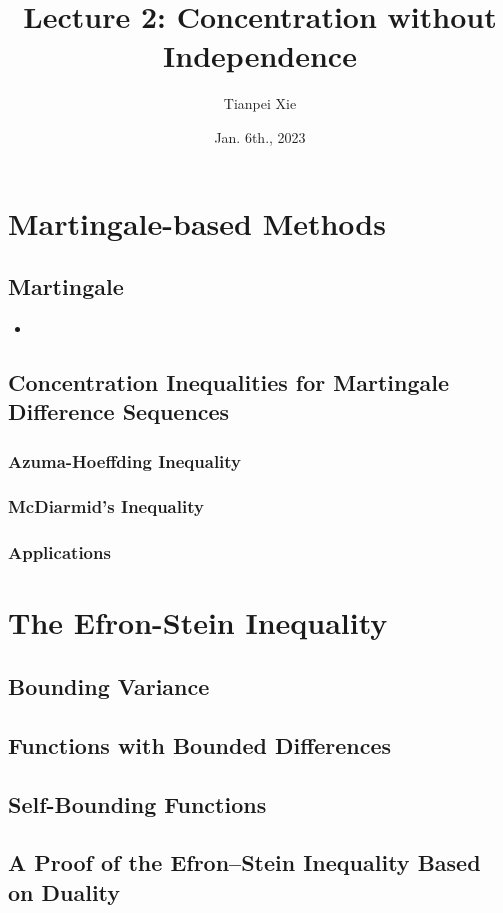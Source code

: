 \documentclass[11pt]{article}
\begin{document}
\title{Lecture 2: Concentration without Independence}
\author{ Tianpei Xie}
\date{Jan. 6th., 2023 }
\maketitle
\tableofcontents
\newpage
\section{Martingale-based Methods}
\subsection{Martingale}
\begin{itemize}
\item 
\end{itemize}

\subsection{Concentration Inequalities for Martingale Difference Sequences}
\subsubsection{Azuma-Hoeffding Inequality}

\subsubsection{McDiarmid's Inequality}

\subsubsection{Applications}

\section{The Efron-Stein Inequality}
\subsection{Bounding Variance}

\subsection{Functions with Bounded Differences}


\subsection{Self-Bounding Functions}

\subsection{A Proof of the Efron–Stein Inequality Based on Duality}
\newpage


\end{document}
